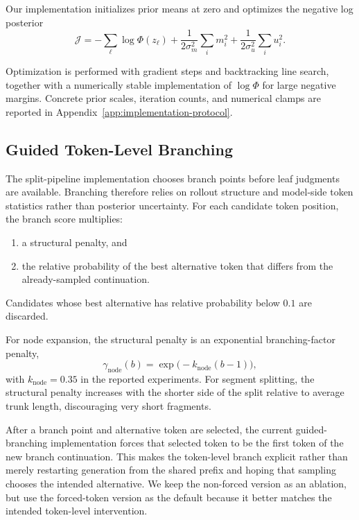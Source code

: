 \documentclass{article}
\begin{document}
Our implementation initializes prior means at zero and optimizes the negative log posterior
\begin{equation}
\mathcal{J} = -\sum_\ell \log \Phi(z_\ell)
+ \frac{1}{2\sigma_m^2}\sum_i m_i^2
+ \frac{1}{2\sigma_u^2}\sum_i u_i^2.
\end{equation}

Optimization is performed with gradient steps and backtracking line search, together with a numerically stable implementation of $\log \Phi$ for large negative margins. Concrete prior scales, iteration counts, and numerical clamps are reported in Appendix~\ref{app:implementation-protocol}.

\subsection{Guided Token-Level Branching}
The split-pipeline implementation chooses branch points before leaf judgments are available. Branching therefore relies on rollout structure and model-side token statistics rather than posterior uncertainty. For each candidate token position, the branch score multiplies:
\begin{enumerate}
    \item a structural penalty, and
    \item the relative probability of the best alternative token that differs from the already-sampled continuation.
\end{enumerate}
Candidates whose best alternative has relative probability below $0.1$ are discarded.

For node expansion, the structural penalty is an exponential branching-factor penalty,
\begin{equation}
\gamma_{\text{node}}(b) = \exp\big(-k_{\text{node}}(b-1)\big),
\end{equation}
with $k_{\text{node}}=0.35$ in the reported experiments.
For segment splitting, the structural penalty increases with the shorter side of the split relative to average trunk length, discouraging very short fragments.

After a branch point and alternative token are selected, the current guided-branching implementation forces that selected token to be the first token of the new branch continuation. This makes the token-level branch explicit rather than merely restarting generation from the shared prefix and hoping that sampling chooses the intended alternative. We keep the non-forced version as an ablation, but use the forced-token version as the default because it better matches the intended token-level intervention.
\end{document}
